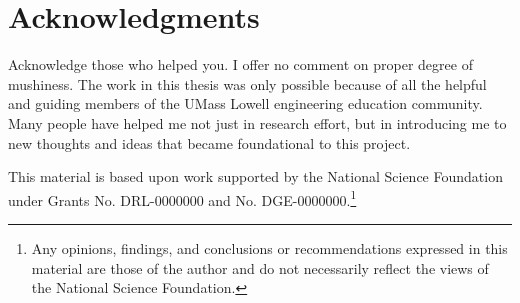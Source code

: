 \chapter*{Acknowledgments}
\renewcommand{\thefootnote}{\fnsymbol{footnote}}

Acknowledge those who helped you. I offer no comment on proper degree of mushiness. The work in this thesis was only possible because of all the helpful and guiding members of the UMass Lowell engineering education community. Many people have helped me not just in research effort, but in introducing me to new thoughts and ideas that became foundational to this project.

This material is based upon work supported by the National Science Foundation under Grants No. DRL-0000000 and No. DGE-0000000.\footnote{Any opinions, findings, and conclusions or recommendations expressed in this material are those of the author and do not necessarily reflect the views of the National Science Foundation.}

\renewcommand{\thefootnote}{\arabic{footnote}} %
